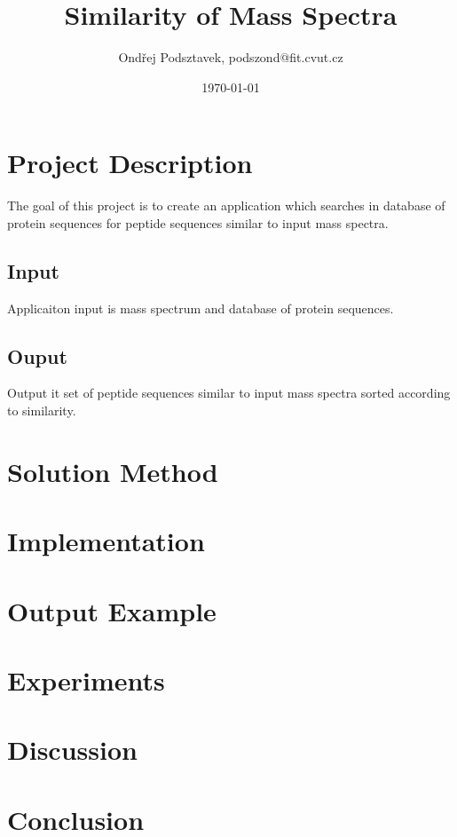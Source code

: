 \documentclass[a4paper,10pt,twocolumn]{article}
\title{Similarity of Mass Spectra}
\date{\today}
\author{Ondřej Podsztavek, podszond@fit.cvut.cz}
\begin{document}
\maketitle

\section{Project Description}

The goal of this project is to create an application which searches
in database of protein sequences for peptide sequences similar to input
mass spectra.

\subsection{Input}

Applicaiton input is mass spectrum and database of protein
sequences.

\subsection{Ouput}

Output it set of peptide sequences similar to input mass
spectra sorted according to similarity.

\section{Solution Method}

\section{Implementation}

\section{Output Example}

\section{Experiments}

\section{Discussion}

\section{Conclusion}



\end{document}
